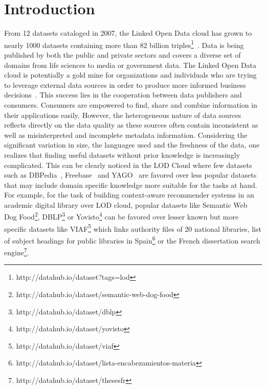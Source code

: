 \documentclass[runningheads,a4paper]{llncs}
\begin{document}

\section{Introduction}
\label{sec:introduction}
From 12 datasets cataloged in 2007, the Linked Open Data cloud has grown to nearly 1000 datasets containing more than 82 billion triples\footnote{http://datahub.io/dataset?tags=lod}~\cite{BizerHeath2009}. Data is being published by both the public and private sectors and covers a diverse set of domains from life sciences to media or government data. The Linked Open Data cloud is potentially a gold mine for organizations and individuals who are trying to leverage external data sources in order to produce more informed business decisions~\cite{Boyd2011}. This success lies in the cooperation between data publishers and consumers. Consumers are empowered to find, share and combine information in their applications easily. However, the heterogeneous nature of data sources reflects directly on the data quality as these sources often contain inconsistent as well as misinterpreted and incomplete metadata information. Considering the significant variation in size, the languages used and the freshness of the data, one realizes that finding useful datasets without prior knowledge is increasingly complicated. This can be clearly noticed in the LOD Cloud where few datasets such as DBPedia~\cite{Bizer:2009:DCP:1640541.1640848}, Freebase~\cite{Bollacker:2008:FCC:1376616.1376746} and YAGO~\cite{Suchanek:2007:YCS:1242572.1242667} are favored over less popular datasets that may include domain specific knowledge more suitable for the tasks at hand. For example, for the task of building context-aware recommender systems in an academic digital library over LOD cloud, popular datasets like Semantic Web Dog Food\footnote{http://datahub.io/dataset/semantic-web-dog-food}, DBLP\footnote{http://datahub.io/dataset/dblp} or Yovisto\footnote{http://datahub.io/dataset/yovisto} can be favored over lesser known but more specific datasets like VIAF\footnote{http://datahub.io/dataset/viaf} which links authority files of 20 national libraries, list of subject headings for public libraries in Spain\footnote{http://datahub.io/dataset/lista-encabezamientos-materia} or the French dissertation search engine\footnote{http://datahub.io/dataset/thesesfr}.
\end{document}

